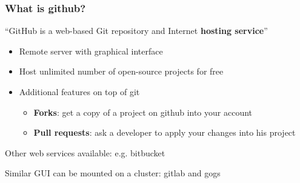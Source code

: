 \documentclass[xcolor=dvipsnames,10pt]{beamer}
\begin{document}
\begin{frame}
 \frametitle{What is github?}
 
 ``GitHub is a web-based Git repository and Internet \textbf{hosting service}''
 \vspace*{0.8cm}
 
 \begin{itemize}
  \item Remote server with graphical interface
  \vspace*{0.3cm}
 
  \item Host unlimited number of open-source projects for free
   \vspace*{0.3cm}
   
  \item Additional features on top of git
  \vspace*{0.2cm}
  
  \begin{itemize}
   \item \textbf{Forks}: get a copy of a project on github into your account
   \vspace*{0.1cm}
   
   \item \textbf{Pull requests}: ask a developer to apply your changes into his project
  \end{itemize}
 \vspace*{0.5cm}
  
 \end{itemize}
 
 Other web services available: e.g. bitbucket
 \vspace*{0.2cm}
 
 Similar GUI can be mounted on a cluster: gitlab and gogs

 
\end{frame}
\end{document}
